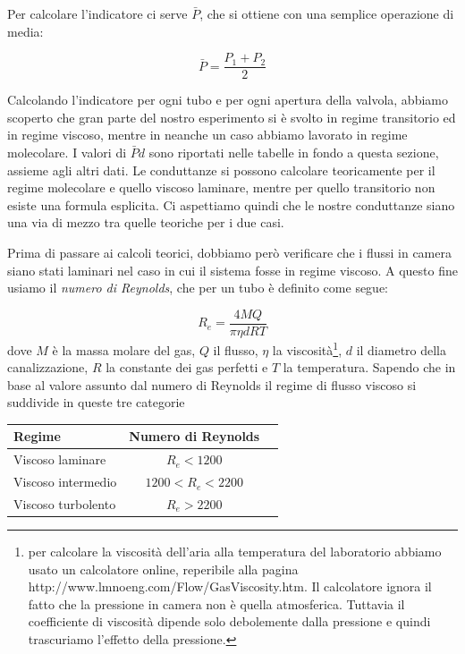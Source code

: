 Per calcolare l'indicatore ci serve $\bar{P}$, che si ottiene con una semplice operazione di media:

\begin{equation}
    \bar{P} = \frac{P_1 + P_2}{2}
\end{equation}

Calcolando l'indicatore per ogni tubo e per ogni apertura della valvola, abbiamo scoperto che gran parte
del nostro esperimento si è svolto in regime transitorio ed in regime viscoso, mentre in neanche un caso abbiamo
lavorato in regime molecolare. I valori di $\bar{P}d$ sono riportati nelle tabelle in fondo a questa sezione,
assieme agli altri dati. Le conduttanze si possono calcolare teoricamente per il regime molecolare e quello
viscoso laminare, mentre per quello transitorio non esiste una formula esplicita. Ci aspettiamo quindi che le nostre
conduttanze siano una via di mezzo tra quelle teoriche per i due casi.

Prima di passare ai calcoli teorici, dobbiamo però verificare che i flussi in camera siano stati laminari nel
caso in cui il sistema fosse in regime viscoso.
A questo fine usiamo il \emph{numero di Reynolds}, che per un tubo è definito come segue:

\begin{equation}
    R_e = \frac{4 M Q}{\pi \eta d R T}
\end{equation}
%
dove $M$ è la massa molare del gas, $Q$ il flusso, $\eta$ la viscosità\footnote{ per calcolare la viscosità dell'aria
alla temperatura del laboratorio abbiamo usato un calcolatore online, reperibile alla pagina http://www.lmnoeng.com/Flow/GasViscosity.htm.
Il calcolatore ignora il fatto che la pressione in camera non è quella atmosferica. Tuttavia il coefficiente di viscosità
dipende solo debolemente dalla pressione e quindi trascuriamo l'effetto della pressione.},
$d$ il diametro della canalizzazione, $R$ la constante dei gas perfetti e $T$ la temperatura.
Sapendo che in base al valore assunto dal numero di Reynolds il regime di flusso viscoso si suddivide in queste tre categorie

\begin{center}
    \small
    \begin{tabular}{l c c}
        \toprule
        Regime & Numero di Reynolds \\
        \midrule
        Viscoso laminare & $R_e < 1200$ \\
        Viscoso intermedio & $1200 < R_e < 2200$ \\
        Viscoso turbolento & $R_e > 2200$ \\
        \bottomrule
    \end{tabular}
\end{center}

